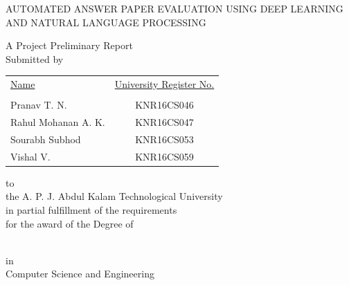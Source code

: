 \newcommand{\jadafont}[1]{{\fontfamily{pzc}\selectfont {\large #1}}}

\begin{titlepage}
\begin{center}
    {\large AUTOMATED ANSWER PAPER EVALUATION USING DEEP LEARNING AND NATURAL LANGUAGE PROCESSING\par}
    \vspace{50px}
	{\LARGE A Project Preliminary Report }\\\medskip
\vspace{20px}
    Submitted by\\
    \vspace{20px}
    \begin{table}[!h]
\centering
\begin{tabular}{lc}
\underline{Name} & \underline{University Register No.} \\
\\
Pranav T. N. & KNR16CS046 \\
Rahul Mohanan A. K. & KNR16CS047 \\
Sourabh Subhod & KNR16CS053 \\
Vishal V. & KNR16CS059 \\
\end{tabular}
\end{table}
\vspace{15px}
to\\
\vspace{15px}
{\sc the A. P. J. Abdul Kalam Technological University\\
\vspace{10px}
in partial fulfillment of the requirements \\
\vspace{10px}
for the award of the Degree of}\\
\vspace{10px}
{\jadafont{Bachelor of Technology}\\\medskip
	{\sc in \\ Computer Science and Engineering} 

}
\end{center}
\end{titlepage}
